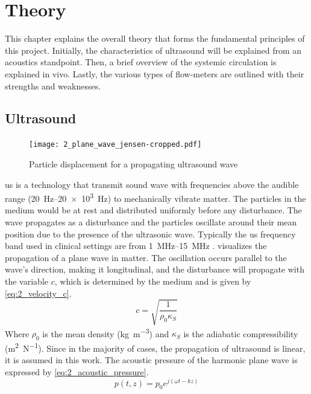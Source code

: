 \chapter{Theory} \label{cha:theory} %
This chapter explains the overall theory that forms the fundamental principles of this project. Initially, the characteristics of ultrasound will be explained from an acoustics standpoint. Then, a brief overview of the systemic circulation is explained in vivo. Lastly, the various types of flow-meters are outlined with their strengths and weaknesses. 
\section{Ultrasound}
\begin{figure}[ht]
	\centering
	\texttt{[image: 2\_plane\_wave\_jensen-cropped.pdf]}
	\caption[Particle displacement for a propagating ultrasound wave]{Particle displacement for a propagating ultrasound wave \cite{JensenUltrasoundBook}}
	\label{fig:2_planewave_jensen}
\end{figure}
\gls{us} is a technology that transmit sound wave with frequencies above the audible range (\qtyrange[range-units = single]{20}{20e3}{\hertz}) to mechanically vibrate matter. The particles in the medium would be at rest and distributed uniformly before any disturbance. The wave propagates as a disturbance and the particles oscillate around their mean position due to the presence of the ultrasonic wave. Typically the \gls{us} frequency band used in clinical settings are from \qtyrange[range-units = single]{1}{15}{\mega\hertz} \cite{Szabo_UltrasoundBook_2}.  visualizes the propagation of a plane wave in matter. The oscillation occurs parallel to the wave's direction, making it longitudinal, and the disturbance will propagate with the variable $c$, which is determined by the medium and is given by \cref{eq:2_velocity_c}.
\begin{equation} \label{eq:2_velocity_c}
	c = \sqrt{\frac{1}{\rho_{0} \kappa_{S}}}
\end{equation}
Where $\rho_{0}$ is the mean density (\unit{\kilogram\per\meter\cubed}) and $\kappa_{S}$ is the \gls{adiabatic} compressibility (\unit{\meter\squared\per\newton}). Since in the majority of cases, the propagation of ultrasound is linear, it is assumed in this work. The acoustic pressure of the harmonic plane wave is expressed by \cref{eq:2_acoustic_pressure}. \raggedbottom
\begin{equation} \label{eq:2_acoustic_pressure}
	p(t,z)=p_{0} e^{j(\omega t - k z)}
\end{equation}
